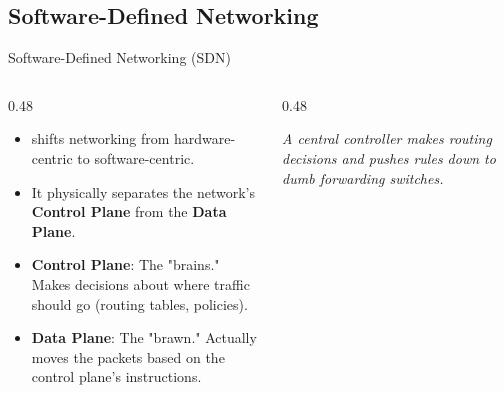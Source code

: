 \documentclass[aspectratio=169]{beamer}  %
\begin{document}
\subsection{Software-Defined Networking}
\begin{frame}[t]{Software-Defined Networking (SDN)}
    \begin{columns}[T]
        \begin{column}{0.48\textwidth}
            \begin{itemize}
                \item {} shifts networking from hardware-centric to software-centric.
                \item It physically separates the network's \textbf{Control Plane} from the \textbf{Data Plane}.
                \item \textbf{Control Plane}: The "brains." Makes decisions about where traffic should go (routing tables, policies).
                \item \textbf{Data Plane}: The "brawn." Actually moves the packets based on the control plane's instructions.
            \end{itemize}
        \end{column}
        \begin{column}{0.48\textwidth}
            \begin{center}
                \par\tiny\textit{A central controller makes routing decisions and pushes rules down to dumb forwarding switches.}
            \end{center}
        \end{column}
    \end{columns}
\end{frame}
\end{document}

